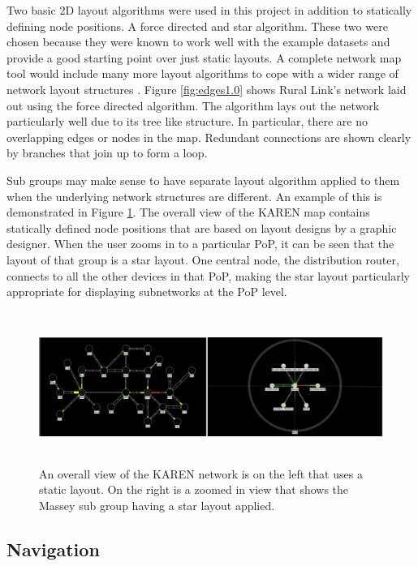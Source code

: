 \documentclass[11pt, a4paper]{article}
\begin{document}
Two basic 2D layout algorithms were used in this project in addition to
statically defining node positions. A force directed and star algorithm. These
two were chosen because they were known to work well with the example datasets
and provide a good starting point over just static layouts. A complete network
map tool would include many more layout algorithms to cope with a wider range of
network layout structures \cite{Paul_2000}. Figure \ref{fig:edges1.0} shows
Rural Link's network laid out using the force directed algorithm. The algorithm
lays out the network particularly well due to its tree like structure. In
particular, there are no overlapping edges or nodes in the map. Redundant
connections are shown clearly by branches that join up to form a loop. 

Sub groups may make sense to have separate layout algorithm applied to them when
the underlying network structures are different. An example of this is
demonstrated in Figure \ref{fig:layouts1.1}. The overall view of the KAREN map
contains statically defined node positions that are based on layout designs by a
graphic designer. When the user zooms in to a particular PoP, it can be seen
that the layout of that group is a star layout. One central node, the
distribution router, connects to all the other devices in that PoP, making the
star layout particularly appropriate for displaying subnetworks at the PoP
level.

\begin{figure}
\centering
\includegraphics[width=170mm,height=49.34mm]{assets/layouts1-1.eps}
\caption{An overall view of the KAREN network is on the left that uses a static
layout. On the right is a zoomed in view that shows the Massey sub group having 
a star layout applied.}
\label{fig:layouts1.1}
\end{figure}


\subsection{Navigation}
\label{sec:navigation.vis}
\end{document}
